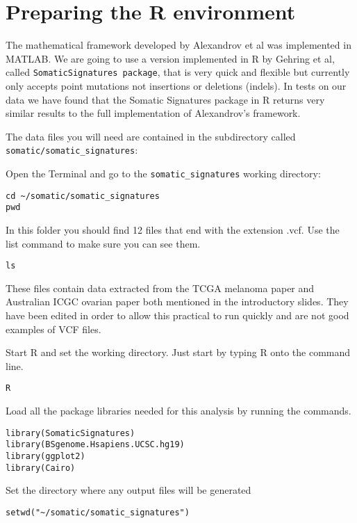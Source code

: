 \section{Preparing the R environment}

\begin{information}
The mathematical framework developed by Alexandrov et al was implemented in MATLAB.
We are going to use a version implemented in R by Gehring et al, called \texttt{SomaticSignatures package}, that is very quick and flexible but currently only accepts point mutations not insertions or deletions (indels).
In tests on our data we have found that the Somatic Signatures package in R returns very similar results to the full implementation of Alexandrov's framework.
\end{information}
\vspace{4 mm}

The data files you will need are contained in the subdirectory called
\texttt{somatic/somatic\_signatures}:

\begin{steps}
Open the Terminal and go to the \texttt{somatic\_signatures} working directory:
\begin{lstlisting}
cd ~/somatic/somatic_signatures
pwd
\end{lstlisting}

In this folder you should find 12 files that end with the extension .vcf. Use the list command to make sure you can see them.
\begin{lstlisting}
ls
\end{lstlisting}
\end{steps}

\begin{note}
These files contain data extracted from the TCGA melanoma paper and Australian ICGC ovarian paper both mentioned in the introductory slides.
They have been edited in order to allow this practical to run quickly and are not good examples of VCF files.
\end{note}

\begin{steps}
Start R and set the working directory. Just start by typing R onto the command line.
\begin{lstlisting}
R
\end{lstlisting}

Load all the package libraries needed for this analysis by running the commands.
\begin{lstlisting}
library(SomaticSignatures)
library(BSgenome.Hsapiens.UCSC.hg19)
library(ggplot2)
library(Cairo)
\end{lstlisting}

Set the directory where any output files will be generated
\begin{lstlisting}
setwd("~/somatic/somatic_signatures")
\end{lstlisting}
\end{steps}


